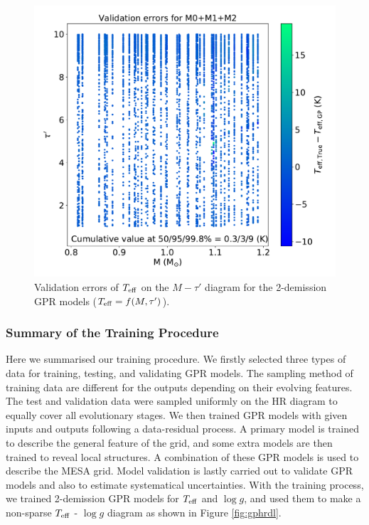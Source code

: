  
 \begin{figure}
	\includegraphics[width=1.0\columnwidth]{off_validation.pdf}
    \caption{Validation errors of $T_{\rm eff}$ on the $M-\tau'$ diagram for the 2-demission GPR models ($T_{\rm eff} = f(M, \tau')$).}  
    \label{fig:off-grid_validation}
\end{figure}

\subsubsection{Summary of the Training Procedure}
Here we summarised our training procedure. We firstly selected three types of data for training, testing, and validating GPR models. The sampling method of training data are different for the outputs depending on their evolving features. The test and validation data were sampled uniformly on the HR diagram to equally cover all evolutionary stages. We then trained GPR models with given inputs and outputs following a data-residual process. A primary model is trained to describe the general feature of the grid, and some extra models are then trained to reveal local structures. A combination of these GPR models is used to describe the \textsc{MESA} grid. Model validation is lastly carried out to validate GPR models and also to estimate systematical uncertainties. With the training process, we trained 2-demission GPR models for $T_{\rm eff}$ and $\log g$, and used them to make a non-sparse $T_{\rm eff}$ - $\log g $ diagram as shown in Figure \ref{fig:gphrdl}. 
 
